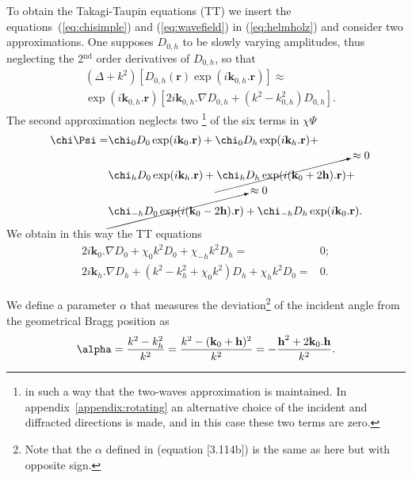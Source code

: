 \documentclass[preprint]{iucr}              %
\begin{document}
To obtain the Takagi-Taupin equations (TT) we insert the equations~(\ref{eq:chisimple}) and (\ref{eq:wavefield}) in (\ref{eq:helmholz}) and consider two approximations. One supposes $D_{0,h}$ to be slowly varying amplitudes, thus neglecting the 2$^{\text{nd}}$ order derivatives of $D_{0,h}$,  so that
\begin{subequations}
\label{eq:approxslowlyvarying}
\begin{align}
&(\Delta + k^2)[D_{0,h}(\textbf{r}) \exp(i\textbf{k}_{0,h} . \textbf{r})] \approx \nonumber  \\
&\exp(i\textbf{k}_{0,h} . \textbf{r}) [2 i \textbf{k}_{0,h} . \nabla D_{0,h} + (k^2 - k^2_{0,h}) D_{0,h}].
\end{align}
\end{subequations}
The second approximation neglects two
\footnote{
in such a way that the two-waves approximation is maintained. In appendix~\ref{appendix:rotating} an alternative choice of the incident and diffracted directions is made, and in this case these two terms are zero.
}
of the six terms in $\chi \Psi$
\begin{subequations}
\label{eq:approxchiPsi}
\begin{align}
\chi\Psi =&
\chi_0 D_0 \exp(i \textbf{k}_0 . \textbf{r}) +
\chi_0 D_h \exp(i \textbf{k}_h . \textbf{r}) + \nonumber \\
&\chi_h D_0 \exp(i \textbf{k}_h . \textbf{r}) +
\cancelto{\approx 0}{\chi_h D_h \exp(i (\textbf{k}_0+2\textbf{h}) . \textbf{r})} + \nonumber \\
&\cancelto{\approx 0}{\chi_{-h} D_0 \exp(i (\textbf{k}_0 - 2 \textbf{h}) .\textbf{r})} +
\chi_{-h} D_h \exp(i \textbf{k}_0 . \textbf{r}) .
\end{align}
\end{subequations}
We obtain in this way the TT equations 
\begin{subequations}
\label{eq:TTvector}
\begin{align}
2 i \textbf{k}_0 . \nabla D_0 + \chi_0 k^2 D_0 + \chi_{-h} k^2 D_h =& 0; \\
2 i \textbf{k}_h . \nabla D_h + (k^2 - k_h^2 + \chi_0 k^2) D_h + \chi_{h} k^2 D_0 =& 0.
\end{align}
\end{subequations}

We define a parameter $\alpha$ that measures the deviation\footnote{
Note that the $\alpha$ defined in \cite{ZachariasenBook} (equation [3.114b]) is the same as here but with opposite sign.
}
of the incident angle from the geometrical Bragg position as
\begin{equation}
\label{eq:alpha}
\alpha = \frac{k^2-k_h^2}{k^2} = \frac{k^2-(\textbf k_0 + \textbf h)^2}{k^2} = - \frac{\textbf h^2 + 2 \textbf k_0 . \textbf h}{k^2}.
\end{equation}
\end{document}
